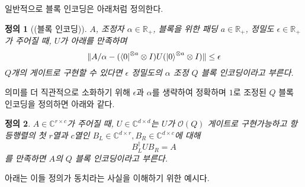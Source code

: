 \documentclass[hidelinks,article,a4paper,chapter,twocolumn]{oblivoir}
\newtheorem{defn}{정의}[chapter]
\begin{document}
일반적으로 블록 인코딩은 \cite{Gilyen2019, Rall2020} 아래처럼 정의한다.
\begin{defn}[(블록 인코딩)]
  $A$, 조정자 $\alpha\in\mathbb{R}_{+}$, 블록을 위한 패딩 $a\in\mathbb{R}_+$,
  정밀도 $\epsilon\in\mathbb{R}_+$가 주어질 때, $U$가 아래를 만족하며
  \begin{equation}
    \|A/\alpha-(\bra0^{\otimes a}\otimes I)U(\ket0^{\otimes a}\otimes I)\|\leq
    \epsilon
  \end{equation}
  $Q$개의 게이트로 구현할 수 있다면 $\epsilon$ 정밀도의 $\alpha$ 조정
  $Q$ 블록 인코딩이라고 부른다.
\end{defn}
의미를 더 직관적으로 소화하기 위해 $\epsilon$과 $\alpha$를 생략하여
정확하며 $1$로 조정된 $Q$ 블록 인코딩을 정의하면 아래와 같다.
\begin{defn}
  $A\in\mathbb{C}^{r\times c}$가 주어질 때, $U\in\mathbb{C}^{d\times d}$는
  $U$가 $\mathcal{O}(Q)$ 게이트로 구현가능하고 항등행렬의 첫 $r$열과 $c$열인
  $B_{L}\in\mathbb{C}^{d\times r},B_{R}\in\mathbb{C}^{d\times c}$에 대해
  \begin{equation}\label{eq:1-1}
    B_{L}^{\dagger}UB_{R} = A
  \end{equation}
  를 만족하면 $A$의 $Q$ 블록 인코딩이라고 부른다. 
\end{defn}
아래는 이들 정의가 동치라는 사실을 이해하기 위한 예시다.
\end{document}
